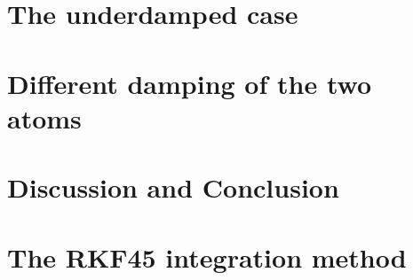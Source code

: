\documentclass[a4paper,12pt]{article}
\begin{document}
    
    
\section{The underdamped case}\label{underdamped:sec}

       
    
\section{Different damping of the two atoms}\label{different:sec}

    

\section{Discussion and Conclusion}\label{conclusion:sec}

	
	
	
\clearpage	
\appendix
\section{The RKF45 integration method}\label{appendix:sec}

    
    
    
\clearpage  %
\end{document}
